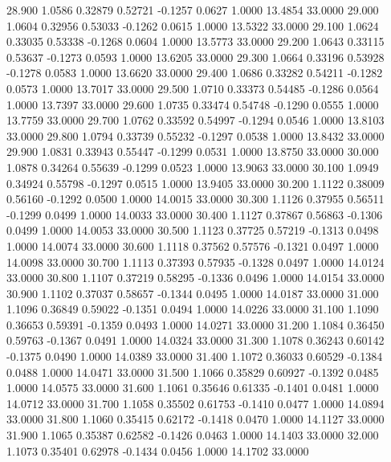   28.900   1.0586   0.32879   0.52721  -0.1257   0.0627   1.0000  13.4854  33.0000
  29.000   1.0604   0.32956   0.53033  -0.1262   0.0615   1.0000  13.5322  33.0000
  29.100   1.0624   0.33035   0.53338  -0.1268   0.0604   1.0000  13.5773  33.0000
  29.200   1.0643   0.33115   0.53637  -0.1273   0.0593   1.0000  13.6205  33.0000
  29.300   1.0664   0.33196   0.53928  -0.1278   0.0583   1.0000  13.6620  33.0000
  29.400   1.0686   0.33282   0.54211  -0.1282   0.0573   1.0000  13.7017  33.0000
  29.500   1.0710   0.33373   0.54485  -0.1286   0.0564   1.0000  13.7397  33.0000
  29.600   1.0735   0.33474   0.54748  -0.1290   0.0555   1.0000  13.7759  33.0000
  29.700   1.0762   0.33592   0.54997  -0.1294   0.0546   1.0000  13.8103  33.0000
  29.800   1.0794   0.33739   0.55232  -0.1297   0.0538   1.0000  13.8432  33.0000
  29.900   1.0831   0.33943   0.55447  -0.1299   0.0531   1.0000  13.8750  33.0000
  30.000   1.0878   0.34264   0.55639  -0.1299   0.0523   1.0000  13.9063  33.0000
  30.100   1.0949   0.34924   0.55798  -0.1297   0.0515   1.0000  13.9405  33.0000
  30.200   1.1122   0.38009   0.56160  -0.1292   0.0500   1.0000  14.0015  33.0000
  30.300   1.1126   0.37955   0.56511  -0.1299   0.0499   1.0000  14.0033  33.0000
  30.400   1.1127   0.37867   0.56863  -0.1306   0.0499   1.0000  14.0053  33.0000
  30.500   1.1123   0.37725   0.57219  -0.1313   0.0498   1.0000  14.0074  33.0000
  30.600   1.1118   0.37562   0.57576  -0.1321   0.0497   1.0000  14.0098  33.0000
  30.700   1.1113   0.37393   0.57935  -0.1328   0.0497   1.0000  14.0124  33.0000
  30.800   1.1107   0.37219   0.58295  -0.1336   0.0496   1.0000  14.0154  33.0000
  30.900   1.1102   0.37037   0.58657  -0.1344   0.0495   1.0000  14.0187  33.0000
  31.000   1.1096   0.36849   0.59022  -0.1351   0.0494   1.0000  14.0226  33.0000
  31.100   1.1090   0.36653   0.59391  -0.1359   0.0493   1.0000  14.0271  33.0000
  31.200   1.1084   0.36450   0.59763  -0.1367   0.0491   1.0000  14.0324  33.0000
  31.300   1.1078   0.36243   0.60142  -0.1375   0.0490   1.0000  14.0389  33.0000
  31.400   1.1072   0.36033   0.60529  -0.1384   0.0488   1.0000  14.0471  33.0000
  31.500   1.1066   0.35829   0.60927  -0.1392   0.0485   1.0000  14.0575  33.0000
  31.600   1.1061   0.35646   0.61335  -0.1401   0.0481   1.0000  14.0712  33.0000
  31.700   1.1058   0.35502   0.61753  -0.1410   0.0477   1.0000  14.0894  33.0000
  31.800   1.1060   0.35415   0.62172  -0.1418   0.0470   1.0000  14.1127  33.0000
  31.900   1.1065   0.35387   0.62582  -0.1426   0.0463   1.0000  14.1403  33.0000
  32.000   1.1073   0.35401   0.62978  -0.1434   0.0456   1.0000  14.1702  33.0000
